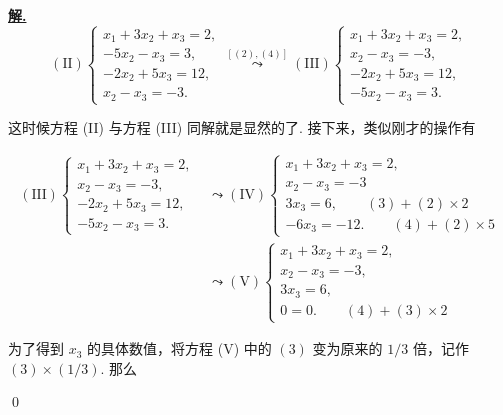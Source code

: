 \documentclass[10pt,openany]{article}
\theoremstyle{thmstyle} %
\theoremstyle{defstyle} %
\theoremstyle{prostyle} %
\newenvironment{solution}{\par\underline{\textbf{解.}} \;\fangsong}{\qed\par}
\begin{document}
\begin{solution}
	\[ (\text{II}) \left\{
	\begin{array}{l}
		x_1 + 3x_2 + x_3 = 2, \\
		-5x_2 - x_3 = 3, \\
		-2x_2 + 5x_3 = 12, \\
		x_2 - x_3 = -3.
	\end{array}
	\right. \overset{[(2),(4)]}{\leadsto} (\text{III}) \left\{
	\begin{array}{l}
		x_1 + 3x_2 + x_3 = 2, \\
		x_2 - x_3 = -3, \\
		-2x_2 + 5x_3 = 12, \\
		-5x_2 - x_3 = 3.
	\end{array}
	\right. \]
	
	这时候方程 (II) 与方程 (III) 同解就是显然的了. 接下来，类似刚才的操作有
	
	 \begin{align*}
		(\text{III}) \left\{
		\begin{array}{l}
			x_1 + 3x_2 + x_3 = 2, \\
			x_2 - x_3 = -3, \\
			-2x_2 + 5x_3 = 12, \\
			-5x_2 - x_3 = 3.
		\end{array}
		\right. &\leadsto (\text{IV}) \left\{
		\begin{array}{l}
			x_1 + 3x_2 + x_3 = 2, \\
			x_2 - x_3 = -3\\
			3x_3 = 6 , \qquad (3)+(2) \times 2 \\
			-6x_3 = -12. \qquad (4)+(2) \times 5
		\end{array}
		\right. \\
		&\leadsto (\text{V}) \left\{
		\begin{array}{l}
			x_1 + 3x_2 + x_3 = 2, \\
			x_2 - x_3 = -3, \\
			3x_3 = 6, \\
			0 = 0. \qquad (4)+(3) \times 2
		\end{array}
		\right.
	\end{align*}  
	
	
	为了得到 \( x_3 \) 的具体数值，将方程 (V) 中的 \( (3) \) 变为原来的 \( 1/3 \) 倍，记作 \( (3) \times (1/3) \). 那么
	

\end{solution}
\end{document}
